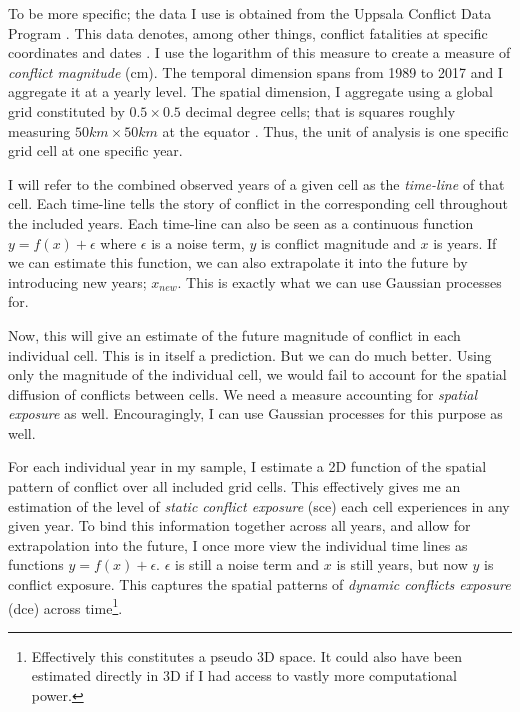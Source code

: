 \documentclass[a4paper]{article}
\begin{document}
To be more specific; the data I use is obtained from the Uppsala Conflict Data Program \citep{UCDP_2017}. This data denotes, among other things, conflict fatalities at specific coordinates and dates \citep{UCDP_2017}. I use the logarithm of this measure to create a measure of \emph{conflict magnitude} (cm). The temporal dimension spans from 1989 to 2017 and I aggregate it at a yearly level. The spatial dimension, I aggregate using a global grid constituted by $0.5 \times 0.5$ decimal degree cells; that is squares roughly measuring $50km\times50km$ at the equator \citep[367]{Tollefsen_2012}. Thus, the unit of analysis is one specific grid cell at one specific year.\par

I will refer to the combined observed years of a given cell as the \emph{time-line} of that cell. Each time-line tells the story of conflict in the corresponding cell throughout the included years. Each time-line can also be seen as a continuous function $y = f(x) + \epsilon$ where $\epsilon$ is a noise term, $y$ is conflict magnitude and $x$ is years. If we can estimate this function, we can also extrapolate it into the future by introducing new years; $x_{new}$. This is exactly what we can use Gaussian processes for.\par

Now, this will give an estimate of the future magnitude of conflict in each individual cell. This is in itself a prediction. But we can do much better. Using only the magnitude of the individual cell, we would fail to account for the spatial diffusion of conflicts between cells. We need a measure accounting for \emph{spatial exposure} as well. Encouragingly, I can use Gaussian processes for this purpose as well.\par

For each individual year in my sample, I estimate a 2D function of the spatial pattern of conflict over all included grid cells. This effectively gives me an estimation of the level of \emph{static conflict exposure} (sce) each cell experiences in any given year. To bind this information together across all years, and allow for extrapolation into the future, I once more view the individual time lines as functions $y = f(x) + \epsilon$. $\epsilon$ is still a noise term and $x$ is still years, but now $y$ is conflict exposure. This captures the spatial patterns of \emph{dynamic conflicts exposure} (dce) across time\footnote{Effectively this constitutes a pseudo 3D space. It could also have been estimated directly in 3D if I had access to vastly more computational power.}.\par
\end{document}
